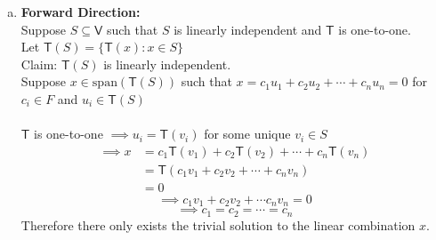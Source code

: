 \begin{enumerate}[(a)]
\item 
\textbf{Forward Direction:}
\\Suppose $S \subseteq \mathsf{V}$ such that  $S$ is linearly independent and
$\mathsf{T}$ is one-to-one.\\ Let $\mathsf{T}(S) = \{\mathsf{T}(x)
\colon x \in S\}$
\\Claim: $\mathsf{T}(S)$ is linearly independent.
\\Suppose $x \in \text{span}(\mathsf{T}(S))$ such that $ x = c_1u_1
+c_2u_2 + \cdots + c_nu_n =0$ for $c_i \in F$ and $u_i \in
\mathsf{T}(S)$
\paragraph{}
$\mathsf{T}$ is one-to-one $\implies u_i =\mathsf{T}(v_i)$ for some
unique $v_i \in S$
\begin{align}
\implies x &= c_1\mathsf{T}(v_1) +c_2\mathsf{T}(v_2) +\cdots +
c_n\mathsf{T}(v_n)\\
&= \mathsf{T}(c_1v_1 +c_2v_2 +\cdots+c_nv_n)\\
&= 0
\end{align}
\begin{equation}
\implies c_1v_1 + c_2v_2 +\cdots c_nv_n = 0
\end{equation}
\begin{equation}
\implies c_1=c_2=\cdots=c_n
\end{equation}
Therefore there only exists the trivial solution to the linear
combination $x$.


\end{enumerate}
